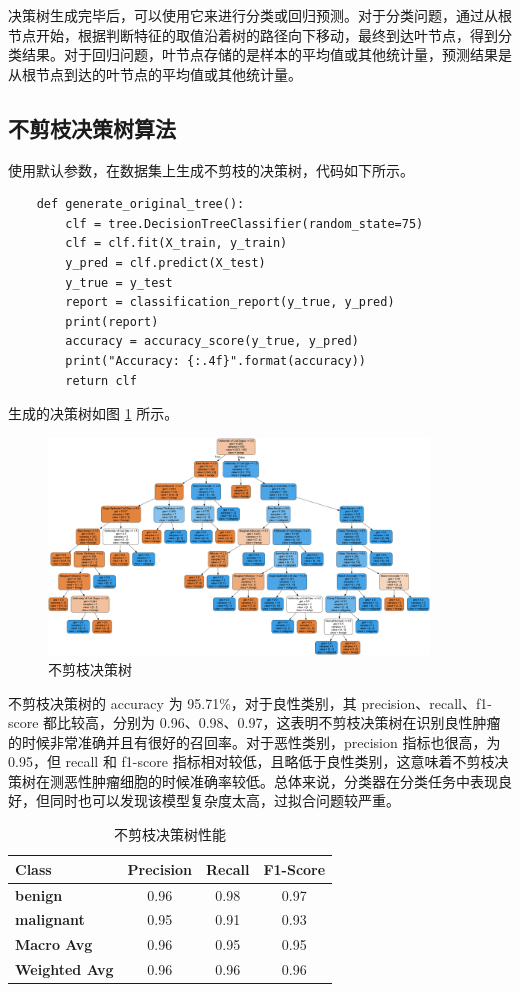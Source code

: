\documentclass[a4paper,12pt,onecolumn,oneside]{article}
\begin{document}
	决策树生成完毕后，可以使用它来进行分类或回归预测。对于分类问题，通过从根节点开始，根据判断特征的取值沿着树的路径向下移动，最终到达叶节点，得到分类结果。对于回归问题，叶节点存储的是样本的平均值或其他统计量，预测结果是从根节点到达的叶节点的平均值或其他统计量。

\subsection{不剪枝决策树算法}\label{bujianzhi}
	使用默认参数，在数据集上生成不剪枝的决策树，代码如下所示。
	\lstset{language=Python}
	\lstset{frame=lines}
	\lstset{basicstyle=\footnotesize}
	\begin{lstlisting}
	def generate_original_tree():
		clf = tree.DecisionTreeClassifier(random_state=75)
		clf = clf.fit(X_train, y_train)
		y_pred = clf.predict(X_test)
		y_true = y_test
		report = classification_report(y_true, y_pred)
		print(report)
		accuracy = accuracy_score(y_true, y_pred)
		print("Accuracy: {:.4f}".format(accuracy))
		return clf
	\end{lstlisting}
	生成的决策树如图 \ref{fig:tree0} 所示。
	\begin{figure}[H]
		\centering
		\includegraphics[width=0.9\textwidth]{res3/trees/tree_0.png}
		\caption{不剪枝决策树}
		\label{fig:tree0}
	\end{figure}
	不剪枝决策树的 accuracy 为 95.71\%，对于良性类别，其 precision、recall、f1-score 都比较高，分别为 0.96、0.98、0.97，这表明不剪枝决策树在识别良性肿瘤的时候非常准确并且有很好的召回率。对于恶性类别，precision 指标也很高，为 0.95，但 recall 和 f1-score 指标相对较低，且略低于良性类别，这意味着不剪枝决策树在测恶性肿瘤细胞的时候准确率较低。总体来说，分类器在分类任务中表现良好，但同时也可以发现该模型复杂度太高，过拟合问题较严重。
	\begin{table}[H]
		\centering
		\begin{tabular}{lccc}
			\toprule
			\textbf{Class} & \textbf{Precision} & \textbf{Recall} & \textbf{F1-Score} \\
			\midrule
			\textbf{benign} & 0.96 & 0.98 & 0.97 \\
			\textbf{malignant} & 0.95 & 0.91 & 0.93 \\
			\midrule
			\textbf{Macro Avg} & 0.96 & 0.95 & 0.95 \\
			\textbf{Weighted Avg} & 0.96 & 0.96 & 0.96 \\
			\bottomrule
		\end{tabular}
		\caption{不剪枝决策树性能}
		\label{tbl:origin}
	\end{table}
\end{document}
